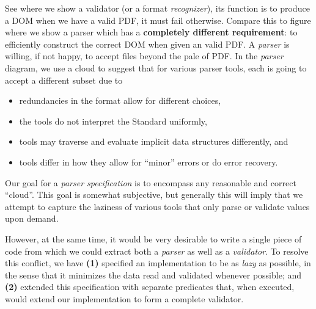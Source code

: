 See  where we show a validator (or a format \emph{recognizer}),
its function is to produce a DOM when we have a valid PDF, it must fail
otherwise.  Compare this to figure  where we show a parser
which has a {\bf{completely different requirement}}: to efficiently construct
the correct DOM when given an valid PDF.  A \emph{parser} is willing, if not
happy, to accept files beyond the pale of PDF.
In the \emph{parser} diagram,
we use a cloud to suggest that for various parser tools,
each is going to accept a different subset due to
\begin{itemize}
\item redundancies in the format allow for different choices,
\item the tools do not interpret the Standard uniformly,
\item tools may traverse and evaluate implicit data structures differently, and
\item tools differ in how they allow for ``minor'' errors or do error recovery.
\end{itemize}
Our goal for a \emph{parser specification} is to encompass any reasonable and
correct ``cloud''.  This goal is somewhat subjective, but generally this will
imply that we attempt to capture the laziness of various tools that only parse
or validate values upon demand.

% 

However, at the same time, it would be very desirable to
write a single piece of code from which we could extract
both a \emph{parser} as well as a \emph{validator}.
To resolve this conflict, we have %
\textbf{(1)} specified an implementation to be as \emph{lazy} as possible, in the sense that it minimizes the data read and validated whenever possible; and %
\textbf{(2)} extended this specification
with separate  predicates that, when executed,
would extend our implementation to form a complete validator.


